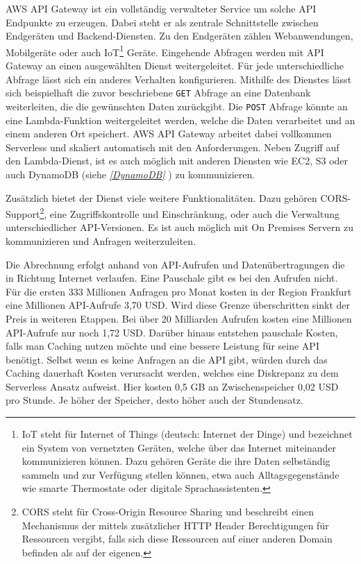 AWS API Gateway ist ein vollständig verwalteter Service um solche API Endpunkte zu erzeugen.
Dabei steht er als zentrale Schnittstelle zwischen Endgeräten und Backend-Diensten.
Zu den Endgeräten zählen Webanwendungen, Mobilgeräte oder auch
IoT\footnote{IoT steht für Internet of Things (deutsch: Internet der Dinge) und bezeichnet ein System von vernetzten Geräten, welche
 über das Internet miteinander kommunizieren können. Dazu gehören Geräte die ihre Daten selbständig sammeln und zur Verfügung stellen können,
 etwa auch Alltagsgegenstände wie smarte Thermostate oder digitale Sprachassistenten. } Geräte.
Eingehende Abfragen werden mit API Gateway an einen ausgewählten Dienst weitergeleitet.
Für jede unterschiedliche Abfrage lässt sich ein anderes Verhalten konfigurieren.
Mithilfe des Dienstes lässt sich beispielhaft die zuvor beschriebene \verb+GET+ Abfrage an eine Datenbank weiterleiten, die die gewünschten Daten zurückgibt.
Die \verb+POST+ Abfrage könnte an eine Lambda-Funktion weitergeleitet werden, welche die Daten verarbeitet und an einem anderen Ort speichert.
AWS API Gateway arbeitet dabei vollkommen Serverless und skaliert automatisch mit den Anforderungen. Neben Zugriff auf den Lambda-Dienst, ist es auch möglich
mit anderen Diensten wie EC2, S3 oder auch DynamoDB (siehe \textit{\ref{DynamoDB} }) zu kommunizieren.

Zusätzlich bietet der Dienst viele weitere Funktionalitäten. Dazu gehören CORS-Support\footnote{CORS steht für Cross-Origin Resource Sharing und
beschreibt einen Mechanismus der mittels zusätzlicher HTTP Header Berechtigungen für Ressourcen vergibt, falls sich diese Ressourcen auf einer anderen
Domain befinden als auf der eigenen.}, eine Zugriffskontrolle und Einschränkung, oder auch die Verwaltung unterschiedlicher
API-Versionen. Es ist auch möglich mit On Premises Servern zu kommunizieren und Anfragen weiterzuleiten.\cite[]{APIGateway}

Die Abrechnung erfolgt anhand von API-Aufrufen und Datenübertragungen die in Richtung Internet verlaufen. Eine Pauschale gibt es bei den Aufrufen nicht.
Für die ersten 333 Millionen Anfragen pro Monat kosten in der Region Frankfurt eine Millionen API-Aufrufe 3,70 USD.
Wird diese Grenze überschritten sinkt der Preis in weiteren Etappen. Bei über 20 Milliarden Aufrufen kosten eine Millionen API-Aufrufe nur noch 1,72 USD.
Darüber hinaus entstehen pauschale Kosten, falls man Caching nutzen möchte und eine bessere Leistung für seine API benötigt.
Selbst wenn es keine Anfragen an die API gibt, würden durch das Caching dauerhaft Kosten verursacht werden, welches eine Diskrepanz zu dem Serverless Ansatz aufweist.
Hier kosten 0,5 GB an Zwischenspeicher 0,02 USD pro Stunde. Je höher der Speicher, desto höher auch der Stundensatz.
\cite[]{APIGWPrice}

